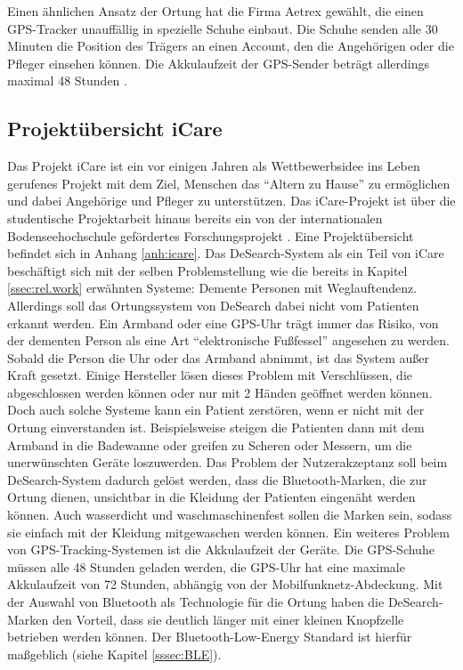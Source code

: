 Einen ähnlichen Ansatz der Ortung hat die Firma Aetrex gewählt, die einen GPS-Tracker unauffällig in spezielle Schuhe einbaut. Die Schuhe senden alle 30 Minuten die Position des Trägers an einen Account, den die Angehörigen oder die Pfleger einsehen können. Die Akkulaufzeit der GPS-Sender beträgt allerdings maximal 48 Stunden \citep[Vgl.][]{aetrex}.



\subsection{Projektübersicht iCare}
Das Projekt iCare ist ein vor einigen Jahren als Wettbewerbsidee ins Leben gerufenes Projekt mit dem Ziel, Menschen das \enquote{Altern zu Hause} zu ermöglichen und dabei Angehörige und Pfleger zu unterstützen.  Das iCare-Projekt ist über die studentische Projektarbeit hinaus bereits ein von der internationalen Bodenseehochschule gefördertes Forschungsprojekt \citep[Vgl.][]{icare-dhbw}. Eine Projektübersicht befindet sich in Anhang \ref{anh:icare}.
Das DeSearch-System als ein Teil von iCare beschäftigt sich mit der selben Problemstellung wie die bereits in Kapitel \ref{ssec:rel.work} erwähnten Systeme: Demente Personen mit Weglauftendenz. Allerdings soll das Ortungssystem von DeSearch dabei nicht vom Patienten erkannt werden. Ein Armband oder eine GPS-Uhr trägt immer das Risiko, von der dementen Person als eine Art \enquote{elektronische Fußfessel} angesehen zu werden. Sobald die Person die Uhr oder das Armband abnimmt, ist das System außer Kraft gesetzt. Einige Hersteller lösen dieses Problem mit Verschlüssen, die abgeschlossen werden können oder nur mit 2 Händen geöffnet werden können. Doch auch solche Systeme kann ein Patient zerstören, wenn er nicht mit der Ortung einverstanden ist. Beispielsweise steigen die Patienten dann mit dem Armband in die Badewanne oder greifen zu Scheren oder Messern, um die unerwünschten Geräte loszuwerden. Das Problem der Nutzerakzeptanz soll beim DeSearch-System dadurch gelöst werden, dass die Bluetooth-Marken, die zur Ortung dienen, unsichtbar in die Kleidung der Patienten eingenäht werden können. Auch wasserdicht und waschmaschinenfest sollen die Marken sein, sodass sie einfach mit der Kleidung mitgewaschen werden können. Ein weiteres Problem von GPS-Tracking-Systemen ist die Akkulaufzeit der Geräte. Die GPS-Schuhe müssen alle 48 Stunden geladen werden, die GPS-Uhr hat eine maximale Akkulaufzeit von 72 Stunden, abhängig von der Mobilfunknetz-Abdeckung. Mit der Auswahl von Bluetooth als Technologie für die Ortung haben die DeSearch-Marken den Vorteil, dass sie deutlich länger mit einer kleinen Knopfzelle betrieben werden können. Der Bluetooth-Low-Energy Standard ist hierfür maßgeblich (siehe Kapitel \ref{sssec:BLE}).

